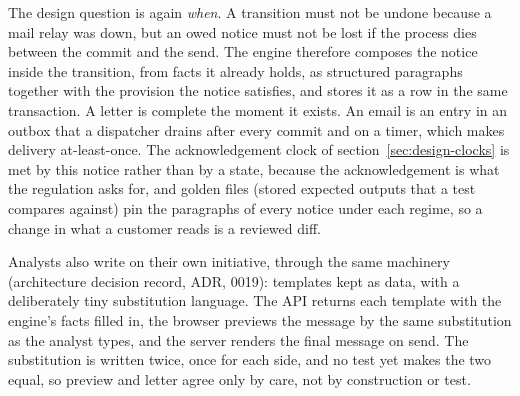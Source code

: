 The design question is again \emph{when}. A transition must not be undone because a mail relay was down, but an
owed notice must not be lost if the process dies between the commit and the send. The engine therefore composes
the notice inside the transition, from facts it already holds, as structured paragraphs together with the
provision the notice satisfies, and stores it as a row in the same transaction. A letter is complete the moment
it exists. An email is an entry in
an outbox that a dispatcher drains after every commit and on a timer, which makes delivery at-least-once. The
acknowledgement clock of section~\ref{sec:design-clocks} is met by this notice rather than by a state, because the
acknowledgement is what the regulation asks for, and golden files (stored expected outputs that a test compares against) pin the paragraphs of every notice under each
regime, so a change in what a customer reads is a reviewed diff.

Analysts also write on their own initiative, through the same machinery (architecture decision record, ADR, 0019): templates kept as data, with
a deliberately tiny substitution language. The API returns each template with the engine's facts filled in, the
browser previews the message by the same substitution as the analyst types, and the server renders the final
message on send. The substitution is written twice, once for each side, and no test yet makes the two equal, so
preview and letter agree only by care, not by construction or test. 
